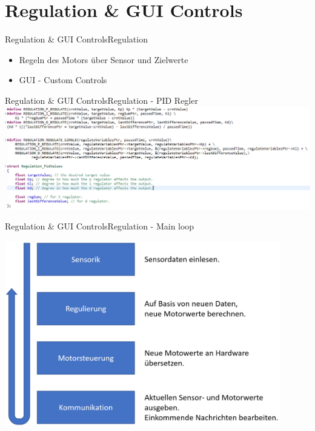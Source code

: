 \section{Regulation \& GUI Controls}
	
	\begin{frame}{Regulation \& GUI Controls}{Regulation}
	  \begin{itemize}
	    \item Regeln des Motors über Sensor und Zielwerte
	    \item GUI - Custom Controls
	  \end{itemize}
	\end{frame}

	\begin{frame}{Regulation \& GUI Controls}{Regulation - PID Regler}
			\includegraphics[width=1.05\textwidth]{../regulation/PIDRegler.png}
	\end{frame}


	\begin{frame}{Regulation \& GUI Controls}{Regulation - Main loop}
		\begin{center}			
			\includegraphics[width=0.9\textwidth]{../regulation/MainLoop.png}
		\end{center}
	\end{frame}


